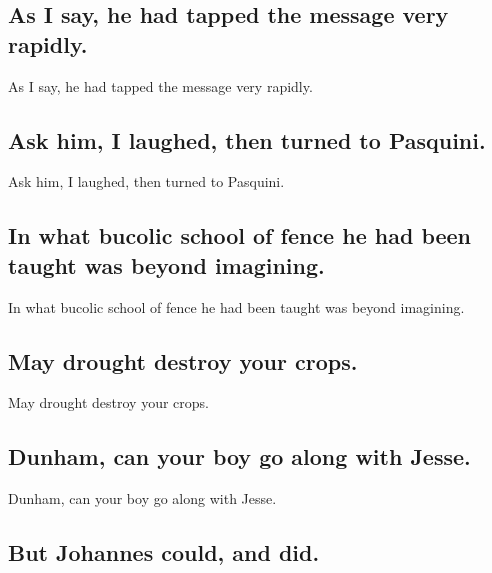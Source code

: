 \documentclass[]{article}
\begin{document}
\hypertarget{as-i-say-he-had-tapped-the-message-very-rapidly.}{%
\subsection{As I say, he had tapped the message very
rapidly.}\label{as-i-say-he-had-tapped-the-message-very-rapidly.}}

As I say, he had tapped the message very rapidly.

\hypertarget{ask-him-i-laughed-then-turned-to-pasquini.}{%
\subsection{Ask him, I laughed, then turned to
Pasquini.}\label{ask-him-i-laughed-then-turned-to-pasquini.}}

Ask him, I laughed, then turned to Pasquini.

\hypertarget{in-what-bucolic-school-of-fence-he-had-been-taught-was-beyond-imagining.}{%
\subsection{In what bucolic school of fence he had been taught was
beyond
imagining.}\label{in-what-bucolic-school-of-fence-he-had-been-taught-was-beyond-imagining.}}

In what bucolic school of fence he had been taught was beyond imagining.

\hypertarget{may-drought-destroy-your-crops.}{%
\subsection{May drought destroy your
crops.}\label{may-drought-destroy-your-crops.}}

May drought destroy your crops.

\hypertarget{dunham-can-your-boy-go-along-with-jesse.}{%
\subsection{Dunham, can your boy go along with
Jesse.}\label{dunham-can-your-boy-go-along-with-jesse.}}

Dunham, can your boy go along with Jesse.

\hypertarget{but-johannes-could-and-did.}{%
\subsection{But Johannes could, and
did.}\label{but-johannes-could-and-did.}}
\end{document}
